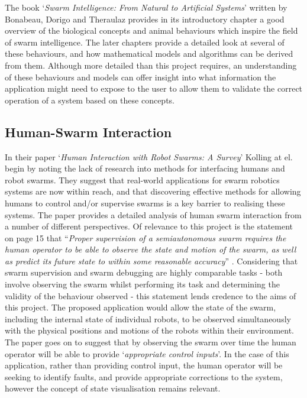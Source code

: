 \documentclass[hidelinks,10pt]{article}
\begin{document}
The book `\textit{Swarm Intelligence: From Natural to Artificial Systems}' written by Bonabeau, Dorigo and Theraulaz \cite{FromNaturaltoArtificial} provides in its introductory chapter a good overview of the biological concepts and animal behaviours which inspire the field of swarm intelligence. The later chapters provide a detailed look at several of these behaviours, and how mathematical models and algorithms can be derived from them. Although more detailed than this project requires, an understanding of these behaviours and models can offer insight into what information the application might need to expose to the user to allow them to validate the correct operation of a system based on these concepts. 

\subsection{Human-Swarm Interaction} \label{HumanSwarmInteraction}
In their paper `\textit{Human Interaction with Robot Swarms: A Survey}' \cite{HumanSwarmInteractionSurvey} Kolling at el. begin by noting the lack of research into methods for interfacing humans and robot swarms. They suggest that real-world applications for swarm robotics systems are now within reach, and that discovering effective methods for allowing humans to control and/or supervise swarms is a key barrier to realising these systems. The paper \cite{HumanSwarmInteractionSurvey} provides a detailed analysis of human swarm interaction from a number of different perspectives. Of relevance to this project is the statement on page 15 that ``\textit{Proper supervision of a semiautonomous swarm requires the human operator to be able to observe the state and motion of the swarm, as well as predict its future state to within some reasonable accuracy}'' \cite{HumanSwarmInteractionSurvey}. Considering that swarm supervision and swarm debugging are highly comparable tasks - both involve observing the swarm whilst performing its task and determining the validity of the behaviour observed  - this statement lends credence to the aims of this project. The proposed application would allow the state of the swarm, including the internal state of individual robots, to be observed simultaneously with the physical positions and motions of the robots within their environment. The paper \cite{HumanSwarmInteractionSurvey} goes on to suggest that by observing the swarm over time the human operator will be able to provide `\textit{appropriate control inputs}'. In the case of this application, rather than providing control input, the human operator will be seeking to identify faults, and provide appropriate corrections to the system, however the concept of state visualisation remains relevant.
\end{document}
